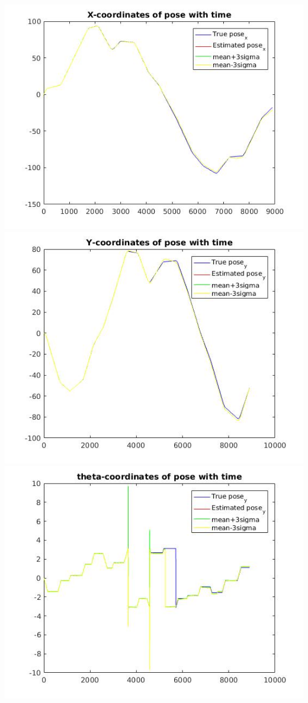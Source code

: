 \documentclass[a4paper,fleqn,11pt]{article}
\theoremstyle{mytheor}
\begin{document}
\begin{center}
\includegraphics[scale = 0.37]{../images/UKF-perfect-control-xvt.jpg}
\includegraphics[scale = 0.37]{../images/UKF-perfect-control-yvt.jpg}
\includegraphics[scale = 0.37]{../images/UKF-perfect-control-avt.jpg}

\end{center}
\end{document}

